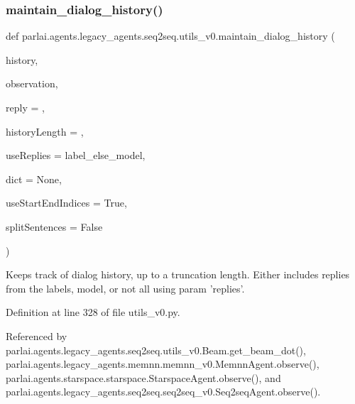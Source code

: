 \subsubsection{\texorpdfstring{maintain\+\_\+dialog\+\_\+history()}{maintain\_dialog\_history()}}
{\footnotesize\ttfamily def parlai.\+agents.\+legacy\+\_\+agents.\+seq2seq.\+utils\+\_\+v0.\+maintain\+\_\+dialog\+\_\+history (\begin{DoxyParamCaption}\item[{}]{history,  }\item[{}]{observation,  }\item[{}]{reply = {\ttfamily \textquotesingle{}\textquotesingle{}},  }\item[{}]{history\+Length = {},  }\item[{}]{use\+Replies = {\ttfamily \textquotesingle{}label\+\_\+else\+\_\+model\textquotesingle{}},  }\item[{}]{dict = {\ttfamily None},  }\item[{}]{use\+Start\+End\+Indices = {\ttfamily True},  }\item[{}]{split\+Sentences = {\ttfamily False} }\end{DoxyParamCaption})}

\begin{DoxyVerb}Keeps track of dialog history, up to a truncation length.
Either includes replies from the labels, model, or not all using param 'replies'.\end{DoxyVerb}
 

Definition at line 328 of file utils\+\_\+v0.\+py.



Referenced by parlai.\+agents.\+legacy\+\_\+agents.\+seq2seq.\+utils\+\_\+v0.\+Beam.\+get\+\_\+beam\+\_\+dot(), parlai.\+agents.\+legacy\+\_\+agents.\+memnn.\+memnn\+\_\+v0.\+Memnn\+Agent.\+observe(), parlai.\+agents.\+starspace.\+starspace.\+Starspace\+Agent.\+observe(), and parlai.\+agents.\+legacy\+\_\+agents.\+seq2seq.\+seq2seq\+\_\+v0.\+Seq2seq\+Agent.\+observe().

